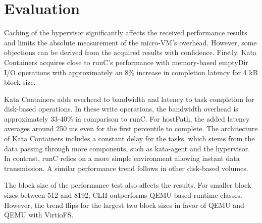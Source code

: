 \section{Evaluation}

Caching of the hypervisor significantly affects the received performance results and limits the absolute measurement of the micro-VM's overhead. However, some objections can be derived from the acquired results with confidence. Firstly, Kata Containers acquires close to runC's performance with memory-based emptyDir I/O operations with approximately an 8\% increase in completion latency for 4 kB block size. 

Kata Containers adds overhead to bandwidth and latency to task completion for disk-based operations. In these write operations, the bandwidth overhead is approximately 33-40\% in comparison to runC. For hostPath, the added latency averages around 250 ms even for the first percentile to complete. The architecture of Kata Containers includes a constant delay for the tasks, which stems from the data passing through more components, such as kata-agent and the hypervisor. In contrast, runC relies on a more simple environment allowing instant data transmission. A similar performance trend follows in other disk-based volumes.

The block size of the performance test also affects the results. For smaller block sizes between 512 and 8192, CLH outperforms QEMU-based runtime classes. However, the trend flips for the largest two block sizes in favor of QEMU and QEMU with VirtioFS.